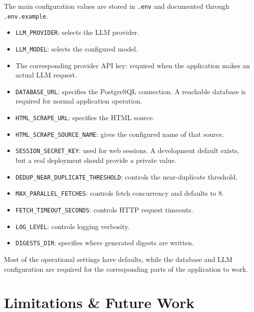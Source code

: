 \documentclass[11pt,a4paper]{article}
\begin{document}
The main configuration values are stored in \texttt{.env} and documented through \texttt{.env.example}.

\begin{itemize}
    \item \texttt{LLM\_PROVIDER}: selects the LLM provider.
    \item \texttt{LLM\_MODEL}: selects the configured model.
    \item The corresponding provider API key: required when the application makes an actual LLM request.
    \item \texttt{DATABASE\_URL}: specifies the PostgreSQL connection. A reachable database is required for normal application operation.
    \item \texttt{HTML\_SCRAPE\_URL}: specifies the HTML source.
    \item \texttt{HTML\_SCRAPE\_SOURCE\_NAME}: gives the configured name of that source.
    \item \texttt{SESSION\_SECRET\_KEY}: used for web sessions. A development default exists, but a real deployment should provide a private value.
    \item \texttt{DEDUP\_NEAR\_DUPLICATE\_THRESHOLD}: controls the near-duplicate threshold.
    \item \texttt{MAX\_PARALLEL\_FETCHES}: controls fetch concurrency and defaults to 8.
    \item \texttt{FETCH\_TIMEOUT\_SECONDS}: controls HTTP request timeouts.
    \item \texttt{LOG\_LEVEL}: controls logging verbosity.
    \item \texttt{DIGESTS\_DIR}: specifies where generated digests are written.
\end{itemize}

Most of the operational settings have defaults, while the database and LLM configuration are required for the corresponding parts of the application to work.

\section{Limitations \& Future Work}\label{sec:limits}
\end{document}
